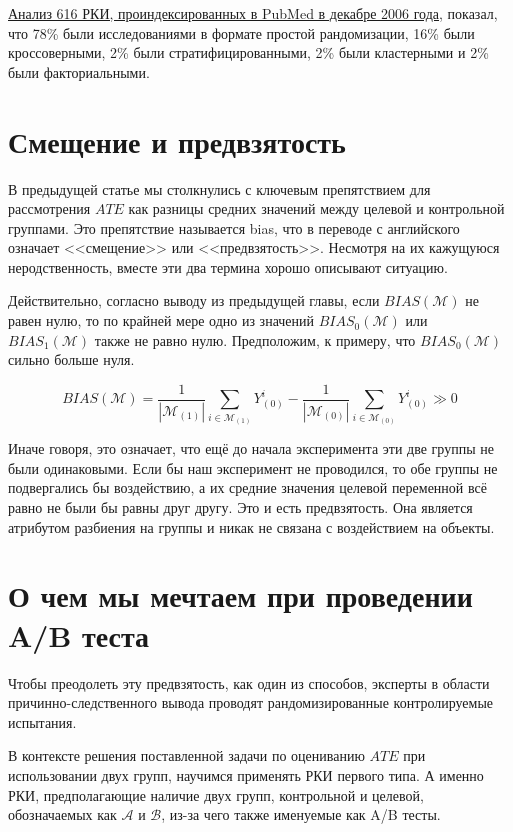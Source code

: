     \href{https://www.bmj.com/content/340/bmj.c723.full}{Анализ 616 РКИ, проиндексированных в PubMed в декабре 2006 года}, показал, что 78\% были исследованиями в формате простой рандомизации, 16\% были кроссоверными, 2\% были стратифицированными, 2\% были кластерными и 2\% были факториальными.


    \section*{Смещение и предвзятость}

        В предыдущей статье мы столкнулись с ключевым препятствием для рассмотрения $ATE$ как разницы средних значений между целевой и контрольной группами.
        Это препятствие называется bias, что в переводе с английского означает <<смещение>> или <<предвзятость>>.
        Несмотря на их кажущуюся неродственность, вместе эти два термина хорошо описывают ситуацию.

        Действительно, согласно выводу из предыдущей главы, если $BIAS(\mathcal{M})$ не равен нулю, то по крайней мере одно из значений $BIAS_0(\mathcal{M})$ или $BIAS_1(\mathcal{M})$ также не равно нулю.
        Предположим, к примеру, что $BIAS_0(\mathcal{M})$ сильно больше нуля.

        \[
            BIAS(\mathcal{M}) =
            \frac{1}{|\mathcal{M}_{(1)}|} \displaystyle\sum_{i\in\mathcal{M}_{(1)}}
            Y^i_{(0)} -
            \frac{1}{|\mathcal{M}_{(0)}|} \displaystyle\sum_{i\in\mathcal{M}_{(0)}}
            Y^i_{(0)} \gg 0
        \]

        Иначе говоря, это означает, что ещё до начала эксперимента эти две группы не были одинаковыми.
        Если бы наш эксперимент не проводился, то обе группы не подвергались бы воздействию, а их средние значения целевой переменной всё равно не были бы равны друг другу.
        Это и есть предвзятость.
        Она является атрибутом разбиения на группы и никак не связана с воздействием на объекты.

    \section*{О чем мы мечтаем при проведении A/B теста}

        Чтобы преодолеть эту предвзятость, как один из способов, эксперты в области причинно-следственного вывода проводят рандомизированные контролируемые испытания.

        В контексте решения поставленной задачи по оцениванию $ATE$ при использовании двух групп, научимся применять РКИ первого типа.
        А именно РКИ, предполагающие наличие двух групп, контрольной и целевой, обозначаемых как $\mathcal{A}$ и $\mathcal{B}$, из-за чего также именуемые как A/B тесты.


